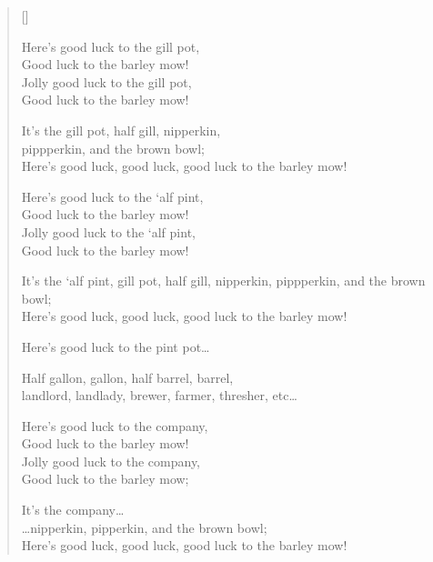 \pagebreak
\settowidth{\versewidth}{nipperkin, pippperkin, and the brown bowl;}
\begin{verse}[\versewidth]
\begin{altverse}
Here's good luck to the gill pot,\\
Good luck to the barley mow!\\
Jolly good luck to the gill pot,\\
Good luck to the barley mow!\\
\end{altverse}
It's the gill pot, half gill, nipperkin,\\
pippperkin, and the brown bowl;\\
Here's good luck, good luck, good luck to the barley mow!


\begin{altverse}
Here's good luck to the `alf pint,\\
Good luck to the barley mow!\\
Jolly good luck to the `alf pint,\\
Good luck to the barley mow!\\
\end{altverse}
It's the `alf pint, gill pot, half gill, nipperkin, pippperkin, and the brown bowl;\\
Here's good luck, good luck, good luck to the barley mow!


Here's good luck to the pint pot\dots{}

Half gallon, gallon, half barrel, barrel,\\
landlord, landlady, brewer, farmer, thresher, etc\dots{}

\begin{altverse}
Here's good luck to the company,\\
Good luck to the barley mow!\\
Jolly good luck to the company,\\
Good luck to the barley mow;\\
\end{altverse}
It's the company\dots{}\\
\dots{}nipperkin, pipperkin, and the brown bowl;\\
Here's good luck, good luck, good luck to the barley mow!
\end{verse}
